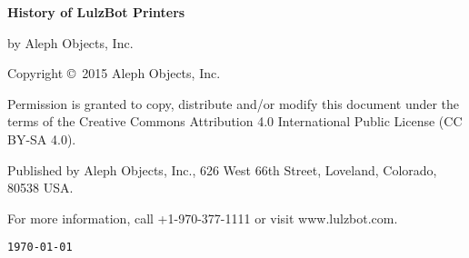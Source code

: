 %
%
%
%
%

\clearpage\null\vfill
\begingroup 
\thispagestyle{empty}
\footnotesize\raggedright
\setlength{\parskip}{0.5\baselineskip}

\textbf{History of LulzBot Printers}

by Aleph Objects, Inc.

Copyright \copyright\ 2015 Aleph Objects, Inc.\par
Permission is granted to copy, distribute and\slash or modify 
this document under the terms of the
Creative Commons Attribution 4.0 International Public License
(CC BY-SA 4.0).

Published by Aleph Objects, Inc., 626 West 66th Street, Loveland, Colorado, 80538 USA.

For more information, call +1-970-377-1111 or visit www.lulzbot.com.

\renewcommand{\dateseparator}{}
\hfill\texttt{\yyyymmdddate\today} %
\endgroup
\pagebreak{}

